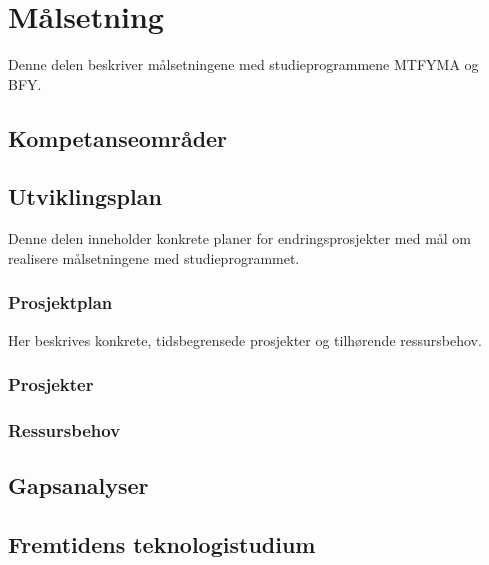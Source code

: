 \documentclass{memoir}
\begin{document}

\part{Målsetning}

Denne delen beskriver målsetningene med studieprogrammene MTFYMA og BFY.


\chapter{Kompetanseområder}






\appendix

\chapter{Utviklingsplan}

Denne delen inneholder konkrete planer for endringsprosjekter med mål om realisere målsetningene med studieprogrammet.

\section{Prosjektplan}

Her beskrives konkrete, tidsbegrensede prosjekter og tilhørende ressursbehov.

\section{Prosjekter}






\section{Ressursbehov}


\chapter{Gapsanalyser}

\chapter{Fremtidens teknologistudium}


\end{document}
